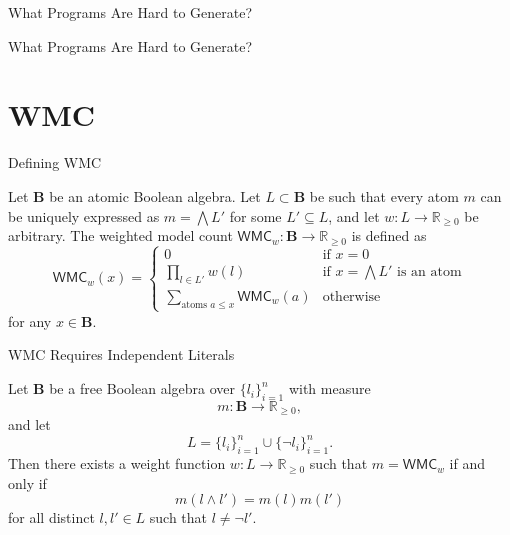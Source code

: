\documentclass{beamer}
\begin{document}
\begin{frame}{What Programs Are Hard to Generate?}
  \begin{figure}
    \centering
    
  \end{figure}
\end{frame}

\begin{frame}{What Programs Are Hard to Generate?}
  \begin{figure}
    \centering
    \resizebox{\linewidth}{!}{}
  \end{figure}
\end{frame}

\section{WMC}

\begin{frame}{Defining WMC}
  \begin{definition}
    Let $\mathbf{B}$ be an atomic Boolean algebra. Let $L \subset \mathbf{B}$ be
    such that every atom $m$ can be uniquely expressed as $m = \bigwedge L'$ for
    some $L' \subseteq L$, and let $w\colon L \to \mathbb{R}_{\ge 0}$ be
    arbitrary. The \alert{weighted model count} $\mathsf{WMC}_w\colon \mathbf{B}
    \to \mathbb{R}_{\ge 0}$ is defined as
    \[
      \mathsf{WMC}_w(x) = \begin{cases}
        0 & \text{if } x = 0 \\
        \prod_{l \in L'} w(l) & \text{if } x = \bigwedge L' \text{ is an atom}
        \\
        \sum_{\text{atoms } a \le x} \mathsf{WMC}_w(a) & \text{otherwise}
      \end{cases}
    \]
    for any $x \in \mathbf{B}$.
  \end{definition}
\end{frame}

\begin{frame}{WMC Requires Independent Literals}
  \begin{theorem}
    Let $\mathbf{B}$ be a free Boolean algebra over $\{ l_i \}_{i=1}^n$ with
    measure
    \[
      m\colon \mathbf{B} \to \mathbb{R}_{\ge 0},
    \]
    and let
    \[
      L = \{ l_i \}_{i = 1}^n \cup \{\neg l_i \}_{i = 1}^n.
    \]
    Then there exists a weight function $w\colon L \to \mathbb{R}_{\ge 0}$ such
    that $m = \mathsf{WMC}_w$ if and only if
    \[
      m(l \land l') = m(l)m(l')
    \]
    for all distinct $l, l' \in L$ such that $l \ne \neg l'$.
  \end{theorem}
\end{frame}
\end{document}
